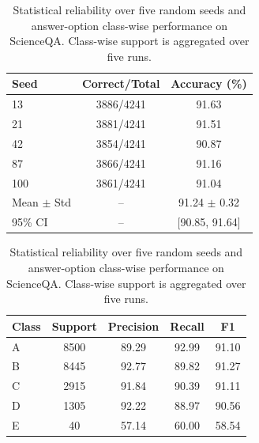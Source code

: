 \documentclass[a4paper, fleqn]{cas-dc}
\begin{document}
\begin{table}[t]
    \centering
    \caption{Statistical reliability over five random seeds and answer-option class-wise performance on ScienceQA. Class-wise support is aggregated over five runs.}
    \label{tab:seed_reliability}
    \vspace{1mm}
    \begin{minipage}{0.43\textwidth}
        \centering
        \begin{tabular*}{\linewidth}{@{\extracolsep{\fill}}lcc@{}}
            \toprule
            \textbf{Seed} & \textbf{Correct/Total} & \textbf{Accuracy (\%)} \\
            \midrule
            13 & 3886/4241 & 91.63 \\
            21 & 3881/4241 & 91.51 \\
            42 & 3854/4241 & 90.87 \\
            87 & 3866/4241 & 91.16 \\
            100 & 3861/4241 & 91.04 \\
            \midrule
            Mean $\pm$ Std & -- & 91.24 $\pm$ 0.32 \\
            95\% CI & -- & [90.85, 91.64] \\
            \bottomrule
        \end{tabular*}
    \end{minipage}
    \hfill
    \begin{minipage}{0.53\textwidth}
        \centering
        \begin{tabular*}{\linewidth}{@{\extracolsep{\fill}}lcccc@{}}
            \toprule
            \textbf{Class} & \textbf{Support} & \textbf{Precision} & \textbf{Recall} & \textbf{F1} \\
            \midrule
            A & 8500 & 89.29 & 92.99 & 91.10 \\
            B & 8445 & 92.77 & 89.82 & 91.27 \\
            C & 2915 & 91.84 & 90.39 & 91.11 \\
            D & 1305 & 92.22 & 88.97 & 90.56 \\
            E & 40 & 57.14 & 60.00 & 58.54 \\
            \bottomrule
        \end{tabular*}
    \end{minipage}
\end{table}
\end{document}
